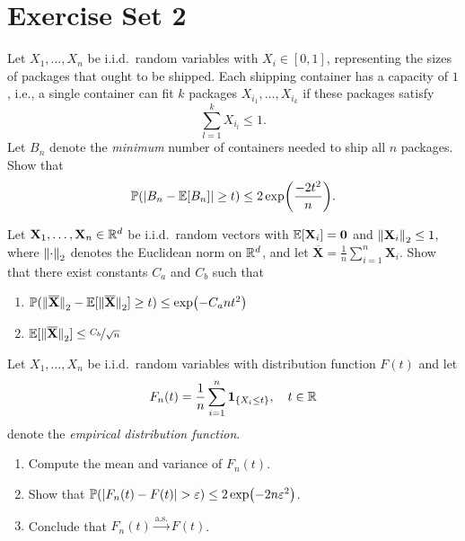 \section{Exercise Set 2}

\begin{exercise}
Let $X_1, \dots, X_n$ be i.i.d.\ random variables with $X_i \in [0,1]$, representing the sizes of packages that ought to be shipped. Each shipping container has a capacity of $1$, i.e., a single container can fit $k$ packages $X_{i_1}, \dots, X_{i_k}$ if these packages satisfy
\[
    \sum_{l=1}^k X_{i_l} \leq 1.
\]
Let $B_n$ denote the \emph{minimum} number of containers needed to ship all $n$ packages. Show that
\[
    \mathbb{P}(\abs{B_n - \operatorname{\mathbb{E}}[B_n]} \geq t) \leq 2 \exp(\frac{-2t^2}{n}).
\]
\end{exercise}


\begin{exercise}
Let $\mathbf{X}_1, \dots, \mathbf{X}_n \in \mathbb{R}^d$ be i.i.d.\ random vectors with $\operatorname{\mathbb{E}}[\mathbf{X}_i] = \mathbf{0}$ and $\norm{\mathbf{X}_i}_2 \leq 1$, where $\norm{\cdot}_2$ denotes the Euclidean norm on $\mathbb{R}^d$, and let $\overline{\mathbf{X}} = \frac{1}{n} \sum_{i=1}^n \mathbf{X}_i$. Show that there exist constants $C_a$ and $C_b$ such that
\begin{enumerate}
    \item $\P(\norm*{\overline{\mathbf{X}}}_2 - \Exp[\norm*{\overline{\mathbf{X}}}_2] \geq t) \leq \exp(-C_a n t^2)$

    \item $\Exp[\norm*{\overline{\mathbf{X}}}_2] \leq \nicefrac{C_b}{\sqrt{n}}$
\end{enumerate}
\end{exercise}


\begin{exercise}
\label{exer: empirical distribution function}
Let $X_1, \dots, X_n$ be i.i.d.\ random variables with distribution function $F(t)$ and let
\[
    F_n(t) = \frac{1}{n} \sum_{i=1}^n \indSet{X_i \leq t}, \quad t \in \R
\]
denote the \emph{empirical distribution function}.
\begin{enumerate}
    \item Compute the mean and variance of $F_n(t)$.

    \item Show that $\mathbb{P}(\abs{F_n(t) - F(t)} > \varepsilon) \leq 2 \exp(-2 n \varepsilon^2)$.

    \item Conclude that $F_n(t) \xrightarrow{\mathrm{a.s.}} F(t)$.
\end{enumerate}
\end{exercise}
